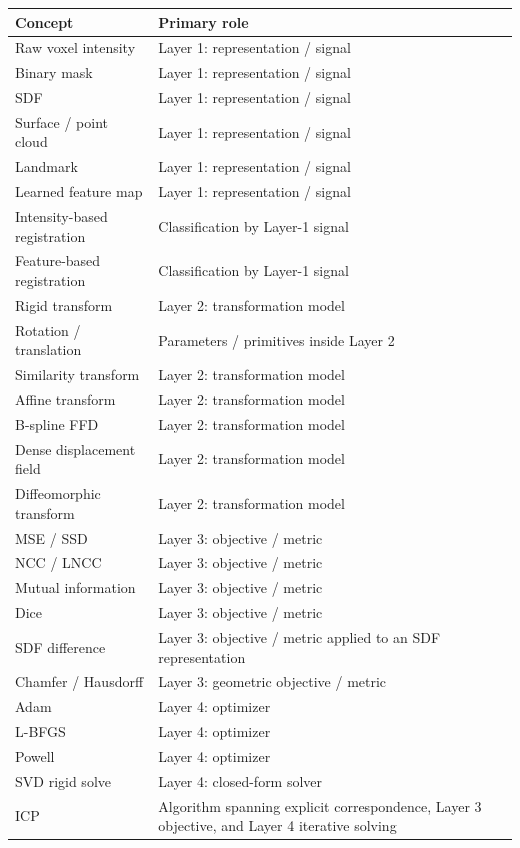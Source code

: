 \documentclass[11pt,a4paper]{article}
\begin{document}
\begin{longtable}{p{}p{}}
\toprule
\textbf{Concept} & \textbf{Primary role}\\
\midrule
Raw voxel intensity & Layer 1: representation / signal\\
Binary mask & Layer 1: representation / signal\\
SDF & Layer 1: representation / signal\\
Surface / point cloud & Layer 1: representation / signal\\
Landmark & Layer 1: representation / signal\\
Learned feature map & Layer 1: representation / signal\\
Intensity-based registration & Classification by Layer-1 signal\\
Feature-based registration & Classification by Layer-1 signal\\
Rigid transform & Layer 2: transformation model\\
Rotation / translation & Parameters / primitives inside Layer 2\\
Similarity transform & Layer 2: transformation model\\
Affine transform & Layer 2: transformation model\\
B-spline FFD & Layer 2: transformation model\\
Dense displacement field & Layer 2: transformation model\\
Diffeomorphic transform & Layer 2: transformation model\\
MSE / SSD & Layer 3: objective / metric\\
NCC / LNCC & Layer 3: objective / metric\\
Mutual information & Layer 3: objective / metric\\
Dice & Layer 3: objective / metric\\
SDF difference & Layer 3: objective / metric applied to an SDF representation\\
Chamfer / Hausdorff & Layer 3: geometric objective / metric\\
Adam & Layer 4: optimizer\\
L-BFGS & Layer 4: optimizer\\
Powell & Layer 4: optimizer\\
SVD rigid solve & Layer 4: closed-form solver\\
ICP & Algorithm spanning explicit correspondence, Layer 3 objective, and Layer 4 iterative solving\\
\bottomrule
\end{longtable}
\end{document}
